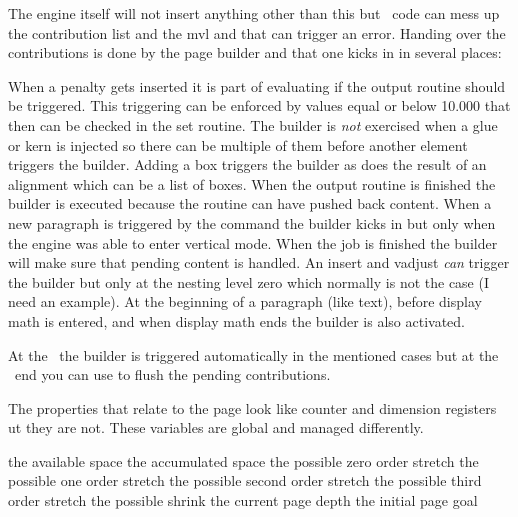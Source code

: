 The engine itself will not insert anything other than this but \LUA\ code can
mess up the contribution list and the mvl and that can trigger an error. Handing
over the contributions is done by the page builder and that one kicks in in
several places:

\startitemize[packed]
\startitem
    When a penalty gets inserted it is part of evaluating if the output routine
    should be triggered. This triggering can be enforced by values equal or below
    10.000 that then can be checked in the set routine.
\stopitem
\startitem
    The builder is {\em not} exercised when a glue or kern is injected so there can
    be multiple of them before another element triggers the builder.
\stopitem
\startitem
    Adding a box triggers the builder as does the result of an alignment which can
    be a list of boxes.
\stopitem
\startitem
    When the output routine is finished the builder is executed because the
    routine can have pushed back content.
\stopitem
\startitem
    When a new paragraph is triggered by the \type {\par} command the builder kicks in
    but only when the engine was able to enter vertical mode.
\stopitem
\startitem
    When the job is finished the builder will make sure that pending content is handled.
\stopitem
\startitem
    An insert and vadjust {\em can} trigger the builder but only at the nesting level zero
    which normally is not the case (I need an example).
\stopitem
\startitem
    At the beginning of a paragraph (like text), before display math is entered,
    and when display math ends the builder is also activated.
\stopitem
\stopitemize

At the \TEX\ the builder is triggered automatically in the mentioned cases but at
the \LUA\ end you can use  to flush the pending
contributions.

The properties that relate to the page look like counter and dimension registers ut
they are not. These variables are global and managed differently.

\starttabulate
\NC \type {\pagegoal}         \NC the available space \NC \NR
\NC \type {\pagetotal}        \NC the accumulated space \NC \NR
\NC \type {\pagestretch}      \NC the possible zero order stretch \NC \NR
\NC \type {\pagefilstretch}   \NC the possible one order stretch \NC \NR
\NC \type {\pagefillstretch}  \NC the possible second order stretch \NC \NR
\NC \type {\pagefilllstretch} \NC the possible third order stretch \NC \NR
\NC \type {\pageshrink}       \NC the possible shrink \NC \NR
\NC \type {\pagedepth}        \NC the current page depth \NC \NR
\NC \type {\pagevsize}        \NC the initial page goal \NC \NR
\stoptabulate

